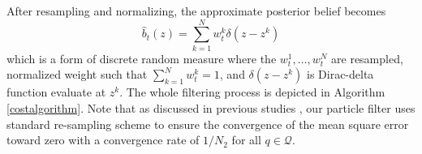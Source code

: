\documentclass[letterpaper, 10 pt, conference]{ieeeconf}
\begin{document}
After resampling and normalizing, the approximate posterior belief becomes
\begin{equation}
\hat{b}_t(z) = \sum_{k=1}^{N} 
w_t^{k} \delta(z - z^{k})
\end{equation}
which is a form of discrete random measure where the $w_t^1,\dots,w_t^N$ are resampled, normalized weight such that $\sum_{k=1}^{N} w_t^{k} = 1$, and $\delta(z - z^{k})$ is Dirac-delta function evaluate at $z^{k}$. 
The whole filtering process is depicted in Algorithm \ref{costalgorithm}.
Note that as discussed in previous studies \cite{crisan2002survey}, our particle filter uses standard re-sampling scheme to ensure the convergence of the mean square error toward zero with a convergence rate of $1/N_2$ for all $q \in \mathcal{Q}$. 
\end{document}
